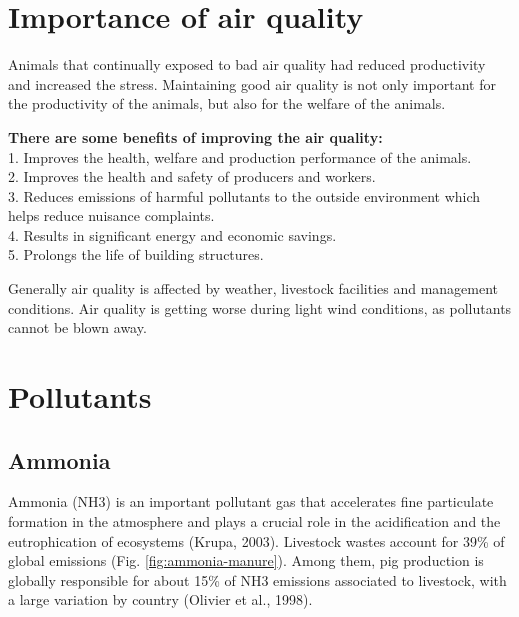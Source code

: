 \documentclass[]{book}
\begin{document}
\hypertarget{importance-of-air-quality}{%
\section{Importance of air quality}\label{importance-of-air-quality}}

Animals that continually exposed to bad air quality had reduced productivity and increased the stress. Maintaining good air quality is not only important for the productivity of the animals, but also for the welfare of the animals.

\textbf{There are some benefits of improving the air quality:}\\
1. Improves the health, welfare and production performance of the animals.\\
2. Improves the health and safety of producers and workers.\\
3. Reduces emissions of harmful pollutants to the outside environment which helps reduce nuisance complaints.\\
4. Results in significant energy and economic savings.\\
5. Prolongs the life of building structures.

Generally air quality is affected by weather, livestock facilities and management conditions. Air quality is getting worse during light wind conditions, as pollutants cannot be blown away.

\hypertarget{pollutants}{%
\section{Pollutants}\label{pollutants}}

\hypertarget{ammonia}{%
\subsection{Ammonia}\label{ammonia}}

Ammonia (NH3) is an important pollutant gas that accelerates fine particulate formation in the atmosphere and plays a crucial role in the acidification and the eutrophication of ecosystems (Krupa, 2003). Livestock wastes account for 39\% of global emissions (Fig. \ref{fig:ammonia-manure}). Among them, pig production is globally responsible for about 15\% of NH3 emissions associated to livestock, with a large variation by country (Olivier et al., 1998).
\end{document}
